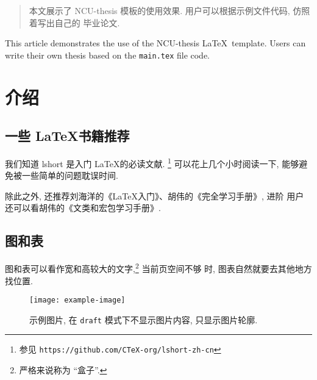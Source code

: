 \documentclass[draft,newenv,newcmd]{ncuthesis}
\begin{document}
\maketitle
\frontmatter
\makedecaut
\begin{abstract}
本文展示了 NCU-thesis 模板的使用效果. 用户可以根据示例文件代码, 仿照着写出自己的
毕业论文. 
\end{abstract}
\begin{abstract*}
This article demonstrates the use of the NCU-thesis \LaTeX\ template.
Users can write their own thesis based on the \verb|main.tex| file code.
\end{abstract*}
\tableofcontents
\mainmatter
\chapter{介绍}
\section{一些 \LaTeX 书籍推荐}
我们知道 lshort\cite{lshortcn} 是入门 \LaTeX 的必读文献.%
\footnote{参见 \texttt{https://github.com/CTeX-org/lshort-zh-cn}}
可以花上几个小时阅读一下, 能够避免被一些简单的问题耽误时间. 

除此之外, 还推荐刘海洋的《\LaTeX 入门》、胡伟的《\LaTeXe 完全学习手册》, 进阶
用户还可以看胡伟的《\LaTeXe 文类和宏包学习手册》. 
\section{图和表}
图和表可以看作宽和高较大的文字,\footnote{严格来说称为 ``盒子''.} 当前页空间不够
时, 图表自然就要去其他地方找位置.

\begin{figure}[htb]
\centering
\texttt{[image: example-image]}
\caption{示例图片, 在 \texttt{draft} 模式下不显示图片内容, 只显示图片轮廓.}
\label{fig:example-fig}
\end{figure}
\end{document}
